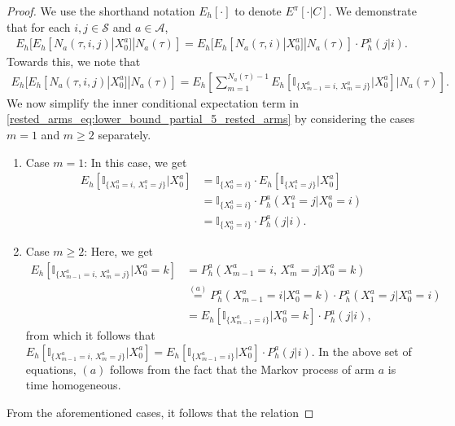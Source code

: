 \begin{proof}
We use the shorthand notation $E_h[\cdot]$ to denote $E^\pi[\cdot|C]$.
We demonstrate that for each $i,j\in \mathcal{S}$ and $a\in \mathcal{A}$,
\begingroup\allowdisplaybreaks\begin{align}
{E}_{h}[{E}_{h}[N_a(\tau,i,j)|X_0^a]|N_a(\tau)]
=E_{h}[E_{h}[N_a(\tau,i)|X_0^a]|N_a(\tau)]\cdot P_h^a(j|i).\label{rested_arms_eq:RelBtwNijAndNiWithIteratedExpec}
\end{align}\endgroup
Towards this, we note that
\begingroup\allowdisplaybreaks\begin{align}
E_{h}[E_{h}[N_a(\tau,i,j)|X_0^a]|N_a(\tau)]
=E_{h}\left[\sum\limits_{m=1}^{N_a(\tau)-1}E_{h}[\mathbb{I}_{\{X_{m-1}^a=i,\,X_m^a=j\}}|X_0^a]\bigg\vert N_a(\tau)\right].\label{rested_arms_eq:lower_bound_partial_5_rested_arms}
\end{align}\endgroup
We now simplify the inner conditional expectation term in \eqref{rested_arms_eq:lower_bound_partial_5_rested_arms} by considering the cases $m=1$ and $m\geq 2$ separately.
\begin{enumerate}
	\item Case $m=1$:
	In this case, we get
	\begingroup\allowdisplaybreaks\begin{align}
	E_{h}[\mathbb{I}_{\{X_{0}^a=i,\,X_1^a=j\}}|X_0^a]
	&=\mathbb{I}_{\{X_{0}^a=i\}}\cdot E_{h}[\mathbb{I}_{\{X_1^a=j\}}|X_0^a]\nonumber\\
	&=\mathbb{I}_{\{X_{0}^a=i\}}\cdot P_h^a(X_1^a=j|X_0^a=i)\nonumber\\
	&=\mathbb{I}_{\{X_{0}^a=i\}}\cdot P_h^a(j|i).\label{rested_arms_eq:Casem=1}
	\end{align}\endgroup
	\item Case $m\geq 2$: Here, we get
	\begingroup\allowdisplaybreaks\begin{align}
	E_{h}[\mathbb{I}_{\{X_{m-1}^a=i,\,X_m^a=j\}}|X_0^a=k]
	&=P_h^a(X_{m-1}^a=i,\,X_m^a=j|X_0^a=k)\nonumber\\
	&\stackrel{(a)}{=}P_h^a(X_{m-1}^a=i|X_0^a=k)\cdot P_h^a(X_1^a=j|X_0^a=i)\nonumber\\
	&=E_{h}[\mathbb{I}_{\{X_{m-1}^{a}=i\}}|X_0^a=k]\cdot P_h^a(j|i),
	\end{align}\endgroup
	from which it follows that $E_{h}[\mathbb{I}_{\{X_{m-1}^a=i,\,X_m^a=j\}}|X_0^a]=E_{h}[\mathbb{I}_{\{X_{m-1}^{a}=i\}}|X_0^a]\cdot P_h^a(j|i)$. In the above set of equations, $(a)$ follows from the fact that the Markov process of arm $a$ is time homogeneous.
\end{enumerate}
From the aforementioned cases, it follows that the relation

\end{proof}
